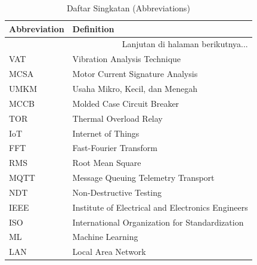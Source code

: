\documentclass{elsinta}
\begin{document}
\begin{longtable}{|p{4cm}|p{11cm}|} %
    \caption{Daftar Singkatan (Abbreviations)} \label{tab:abbreviations2} \\
    \hline
    \textbf{Abbreviation} & \textbf{Definition} \\
    \hline
    \endhead %
    
    \hline 
    \multicolumn{2}{|r|}{Lanjutan di halaman berikutnya...} \\ 
    \endfoot %
    
    \hline
    \endlastfoot %

    VAT & Vibration Analysis Technique \\
    \hline
    MCSA & Motor Current Signature Analysis \\
    \hline
    UMKM & Usaha Mikro, Kecil, dan Menegah\\
    \hline
    MCCB & Molded Case Circuit Breaker\\
    \hline
    TOR & Thermal Overload Relay\\
    \hline
    IoT & Internet of Things \\
    \hline
    FFT & Fast-Fourier Transform\\
    \hline
    RMS & Root Mean Square \\
    \hline
    MQTT & Message Queuing Telemetry Transport \\
    \hline
    NDT & Non-Destructive Testing \\
    \hline
    IEEE & Institute of Electrical and Electronics Engineers \\
    \hline
    ISO & International Organization for Standardization \\
    \hline
    ML & Machine Learning \\
    \hline
    LAN & Local Area Network \\
    \hline
    

\end{longtable}

\end{document}
